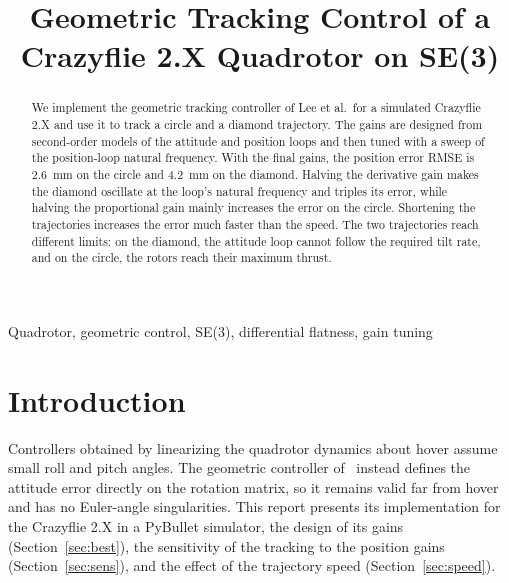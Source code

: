 \documentclass[conference]{IEEEtran}
\begin{document}
\title{Geometric Tracking Control of a Crazyflie 2.X Quadrotor on SE(3)}

\author{
}

\maketitle

\begin{abstract}
We implement the geometric tracking controller of Lee et al.\ for a simulated
Crazyflie 2.X and use it to track a circle and a diamond trajectory. The
gains are designed from second-order models of the attitude and position
loops and then tuned with a sweep of the position-loop natural frequency.
With the final gains, the position error RMSE is 2.6~mm on the circle and
4.2~mm on the diamond. Halving the derivative gain makes the diamond
oscillate at the loop's natural frequency and triples its error, while
halving the proportional gain mainly increases the error on the circle.
Shortening the trajectories increases the error much faster than the speed.
The two trajectories reach different limits: on the diamond, the attitude
loop cannot follow the required tilt rate, and on the circle, the rotors
reach their maximum thrust.
\end{abstract}

\begin{IEEEkeywords}
Quadrotor, geometric control, SE(3), differential flatness, gain tuning
\end{IEEEkeywords}

\section{Introduction}
Controllers obtained by linearizing the quadrotor dynamics about hover assume
small roll and pitch angles. The geometric controller of~\cite{lee} instead
defines the attitude error directly on the rotation matrix, so it remains
valid far from hover and has no Euler-angle singularities. This report
presents its implementation for the Crazyflie 2.X in a PyBullet simulator,
the design of its gains (Section~\ref{sec:best}), the sensitivity of the
tracking to the position gains (Section~\ref{sec:sens}), and the effect of
the trajectory speed (Section~\ref{sec:speed}).
\end{document}
